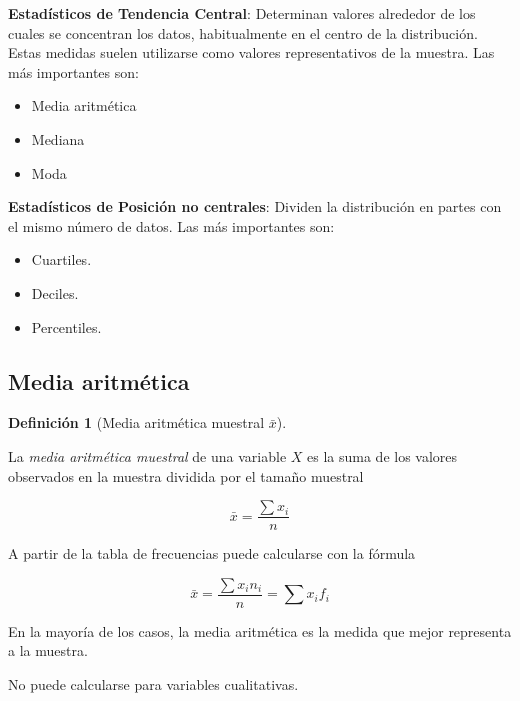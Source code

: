\documentclass[
  a4paper,
]{scrreport}
\providecommand{\tightlist}{%
  \setlength{\itemsep}{0pt}\setlength{\parskip}{0pt}}\usepackage{longtable,booktabs,array}
\theoremstyle{plain}
\theoremstyle{definition}
\theoremstyle{definition}
\newtheorem{definition}{Definición}[chapter]
\theoremstyle{remark}
\begin{document}
\textbf{Estadísticos de Tendencia Central}: Determinan valores alrededor
de los cuales se concentran los datos, habitualmente en el centro de la
distribución. Estas medidas suelen utilizarse como valores
representativos de la muestra. Las más importantes son:

\begin{itemize}
\tightlist
\item
  Media aritmética
\item
  Mediana
\item
  Moda
\end{itemize}

\textbf{Estadísticos de Posición no centrales}: Dividen la distribución
en partes con el mismo número de datos. Las más importantes son:

\begin{itemize}
\tightlist
\item
  Cuartiles.
\item
  Deciles.
\item
  Percentiles.
\end{itemize}

\subsection{Media aritmética}\label{media-aritmuxe9tica}

\begin{definition}[Media aritmética muestral
\(\bar{x}\)]\protect\hypertarget{def-media-aritmetica}{}\label{def-media-aritmetica}

La \emph{media aritmética muestral} de una variable \(X\) es la suma de
los valores observados en la muestra dividida por el tamaño muestral

\[\bar{x} = \frac{\sum x_i}{n}\]

\end{definition}

A partir de la tabla de frecuencias puede calcularse con la fórmula

\[\bar{x} = \frac{\sum x_in_i}{n} = \sum x_i f_i\]

En la mayoría de los casos, la media aritmética es la medida que mejor
representa a la muestra.

\begin{tcolorbox}[enhanced jigsaw, coltitle=black, rightrule=.15mm, colback=white, left=2mm, bottomrule=.15mm, colbacktitle=quarto-callout-warning-color!10!white, opacityback=0, colframe=quarto-callout-warning-color-frame, bottomtitle=1mm, toprule=.15mm, toptitle=1mm, leftrule=.75mm, breakable, opacitybacktitle=0.6, title=\textcolor{quarto-callout-warning-color}{\faExclamationTriangle}\hspace{0.5em}{Advertencia}, arc=.35mm, titlerule=0mm]

No puede calcularse para variables cualitativas.

\end{tcolorbox}
\end{document}
